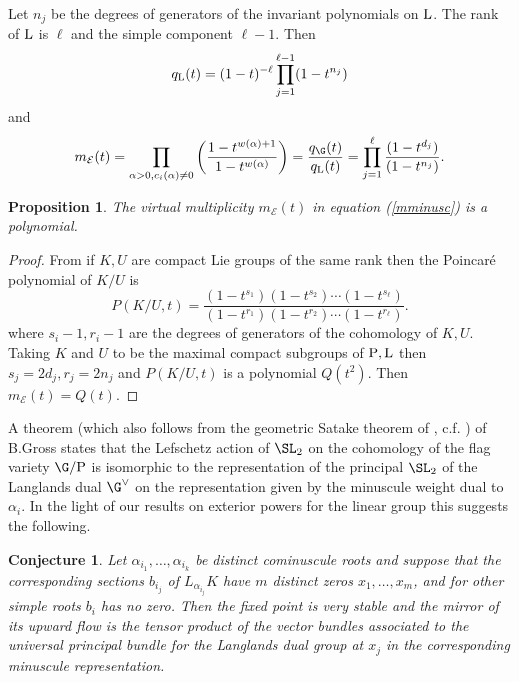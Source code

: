 \documentclass[12pt]{article}
\numberwithin{equation}{section}
\newtheorem{proposition}[theorem]{Proposition}
\newtheorem{conjecture}[theorem]{Conjecture}
\theoremstyle{remark}
\theoremstyle{definition}
\numberwithin{theorem}{section}
\def\calE{{\mathcal E}}
\renewcommand{\1}{\mathbbm{1}}
\begin{document}
Let $n_j$ be the degrees of  generators of the invariant polynomials on $\rm L$. The rank of $\rm L$ is $\ell$ and the simple component $\ell-1$.  Then 
$$q_{\rm L}(t)=(1-t)^{-{\ell}}  \prod_{j=1}^{\ell-1}(1-t^{n_j})$$
and 
\begin{equation}
m_\calE(t)=\prod_{\alpha>0, c_i(\alpha)\ne 0}\left(\frac{1-t^{w(\alpha)+1}}{1-t^{w(\alpha)}}\right)=\frac{q_\G(t)}{q_{\rm L}(t)}= \prod_{j=1}^{\ell}\frac{(1-t^{d_j})}{(1-t^{n_j})}.
\label{mminusc}
\end{equation}
\begin{proposition} \label{cominint} The virtual multiplicity $m_\calE(t)$ in equation (\ref{mminusc}) is a polynomial.
\end{proposition} 
\begin{proof} From \cite[Theorem 26.1]{Borel}  if $K,U$ are compact Lie groups of the same rank then the Poincar\'e polynomial of $K/U$ is 
	$$P(K/U,t)=\frac{(1-t^{s_1})(1-t^{s_2})\cdots (1-t^{s_{\ell}})}{(1-t^{r_1})(1-t^{r_2})\cdots (1-t^{r_{\ell}})}.$$
	where $s_i-1, r_i-1$ are the degrees of generators of the cohomology of $K,U$. Taking $K$ and $U$ to be the maximal compact subgroups of ${\rm P},{\rm L}$ then $s_j=2d_j, r_j=2n_j$ and   $P(K/U,t)$ is a polynomial $Q(t^2)$. Then $m_\calE(t)=Q(t)$. 
\end{proof}
A theorem (which also follows from the geometric Satake theorem of \cite{mirkovic-villonen}, c.f. \cite[Theorem 1.6.3]{ginzburg}) of B.Gross \cite[Corollary 6.4]{Gross}  states that the Lefschetz action of $\SL_2$ on the cohomology of the flag variety $\G/{\rm P}$ is isomorphic to the representation of the principal $\SL_2$ of the Langlands dual $\G^{\vee}$ on the  representation given by the minuscule weight dual to $\alpha_i$. In the light of our results on exterior powers for the linear group this suggests the following.

\begin{conjecture}  \label{cominmirror} Let $\alpha_{i_1},\dots,\alpha_{i_k}$ be distinct cominuscule roots and suppose that the corresponding sections $b_{i_j}$ of $L_{\alpha_{i_j}}K$ have $m$ distinct zeros $x_1,\dots, x_m$, and for other simple roots $b_i$ has no zero. 
	Then the fixed point  is very stable and the mirror of its upward flow is the tensor product of the vector bundles associated to the universal principal bundle for the Langlands dual group at $x_j$ in the corresponding minuscule representation. \end{conjecture}
	
\end{document}
